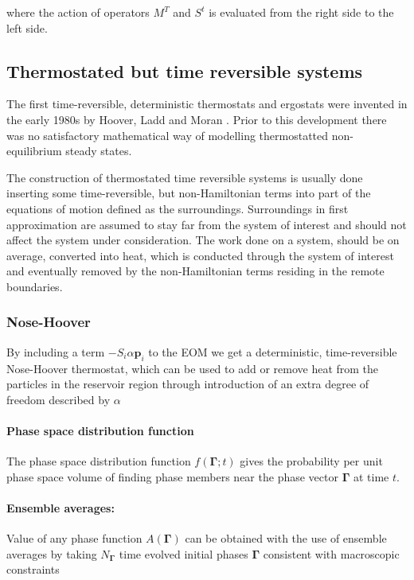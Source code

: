 \documentclass[a4paper,12pt,nofootinbib]{article}
\begin{document}
where the action of operators $M^T$ and $S^t$ is evaluated from the right side to the left side.

\subsection{Thermostated but time reversible systems}

The first time-reversible, deterministic thermostats and ergostats were invented in the early 1980s by Hoover, Ladd and Moran . Prior to this development there was no satisfactory mathematical way of modelling thermostatted non-equilibrium steady states. \cite{Hoover:1982dp}

The construction of thermostated time reversible systems is usually done inserting some time-reversible, but non-Hamiltonian terms into part of the equations of motion defined as the surroundings. Surroundings in first approximation are assumed to stay far from the system of interest and should not affect the system under consideration.
The work done on a system, should be on average, converted into heat, which is conducted through the system of interest and eventually removed by the non-Hamiltonian terms residing in the remote boundaries.

\subsubsection{Nose-Hoover}
By including a term $-S_i \alpha \bm{p}_i $ to the EOM we get a deterministic, time-reversible Nose-Hoover thermostat, which can be used to add or remove heat from the particles in the reservoir region through introduction of an extra degree of freedom described by $\alpha$


\paragraph{Phase space distribution function}

The phase space distribution function $f(\bm{\Gamma};t)$ gives the probability per unit phase space volume of finding phase members near the phase vector $\bm{\Gamma}$ at time $t$.

 

\paragraph{Ensemble averages:}

Value of any phase function $A(\bm{\Gamma})$ can be obtained with the use of ensemble averages by taking $N_{\bm{\Gamma}} $ time evolved initial phases $\bm{\Gamma}$ consistent with macroscopic constraints
\end{document}
